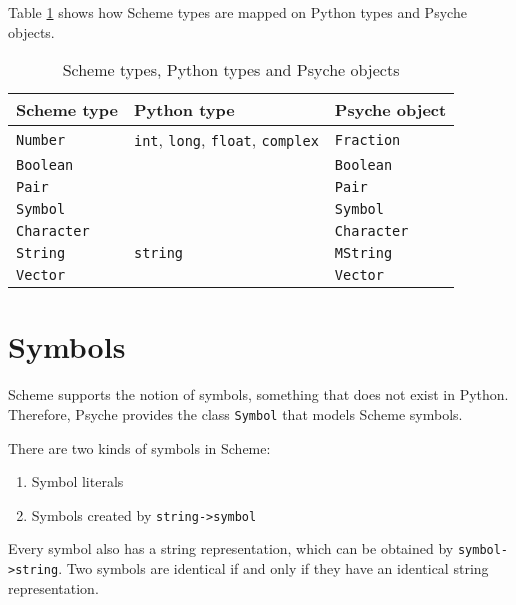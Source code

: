 \documentclass{report}
\newcommand{\code}[1]{\texttt{#1}}
\begin{document}
Table \ref{figure:types} shows how Scheme types are mapped on Python
types and Psyche objects. 

\begin{table}
  \begin{center}
    \begin{tabular}{|lll|}
    \hline
    Scheme type         & Python type       & Psyche object \\
    \hline
    \code{Number}      & \code{int}, \code{long}, 
                          \code{float}, \code{complex}
                                            & \code{Fraction} \\
    \code{Boolean}     &                   & \code{Boolean} \\
    \code{Pair}        &                   & \code{Pair} \\
    \code{Symbol}      &                   & \code{Symbol} \\
    \code{Character}   &                   & \code{Character} \\
    \code{String}      & \code{string}    & \code{MString} \\
    \code{Vector}      &                   & \code{Vector} \\
    \hline
    \end{tabular}
  \end{center}

  \caption{Scheme types, Python types and Psyche objects}
  \label{figure:types}
\end{table}

\section{Symbols}
\label{sect:symbols}

Scheme supports the notion of symbols, something that does not exist
in Python. Therefore, Psyche provides the class \code{Symbol} that
models Scheme symbols.

There are two kinds of symbols in Scheme:
\begin{enumerate}
\item Symbol literals
\item Symbols created by \code{string->symbol}
\end{enumerate}

Every symbol also has a string representation, which can be obtained by
\code{symbol->string}. Two symbols are identical if and only if
they have an identical string representation.
\end{document}
